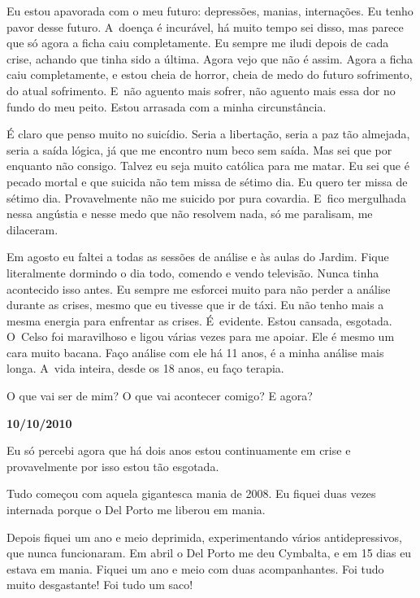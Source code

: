 Eu estou apavorada com o meu futuro: depressões, manias, internações. Eu
tenho pavor desse futuro. A~doença é incurável, há muito tempo sei
disso, mas parece que só agora a ficha caiu completamente. Eu sempre me
iludi depois de cada crise, achando que tinha sido a última. Agora vejo
que não é assim. Agora a ficha caiu completamente, e estou cheia de
horror, cheia de medo do futuro sofrimento, do atual sofrimento. E~não
aguento mais sofrer, não aguento mais essa dor no fundo do meu peito.
Estou arrasada com a minha circunstância.

É claro que penso muito no suicídio. Seria a libertação, seria a paz tão
almejada, seria a saída lógica, já que me encontro num beco sem saída.
Mas sei que por enquanto não consigo. Talvez eu seja muito católica para
me matar. Eu sei que é pecado mortal e que suicida não tem missa de sétimo
dia. Eu quero ter missa de sétimo dia. Provavelmente não me suicido por
pura covardia. E~fico mergulhada nessa angústia e nesse medo que não
resolvem nada, só me paralisam, me dilaceram.

Em agosto eu faltei a todas as sessões de análise e às aulas do Jardim.
Fique literalmente dormindo o dia todo, comendo e vendo televisão. Nunca
tinha acontecido isso antes. Eu sempre me esforcei muito para não perder
a análise durante as crises, mesmo que eu tivesse que ir de táxi. Eu não
tenho mais a mesma energia para enfrentar as crises. É~evidente. Estou
cansada, esgotada. O~Celso foi maravilhoso e ligou várias vezes para me
apoiar. Ele é mesmo um cara muito bacana. Faço análise com ele há 11
anos, é a minha análise mais longa. A~vida inteira, desde os 18 anos, eu
faço terapia.

O que vai ser de mim? O que vai acontecer comigo? E agora?

\begin{flushright}\textbf{10/10/2010}\end{flushright}


Eu só percebi agora que há dois anos estou continuamente em crise e
provavelmente por isso estou tão esgotada.

Tudo começou com aquela gigantesca mania de 2008. Eu fiquei duas vezes
internada porque o Del Porto me liberou em mania.

Depois fiquei um ano e meio deprimida, experimentando vários
antidepressivos, que nunca funcionaram. Em abril o Del Porto me deu
Cymbalta, e em 15 dias eu estava em mania. Fiquei um ano e meio com duas
acompanhantes. Foi tudo muito desgastante! Foi tudo um saco!

